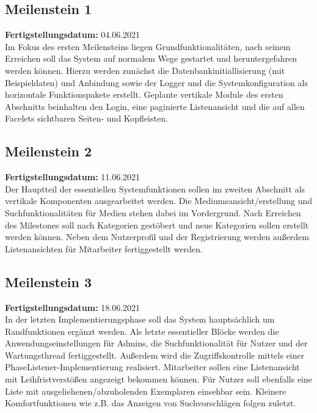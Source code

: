 \documentclass{article}
\begin{document}
\subsection{Meilenstein 1}
\textbf{Fertigstellungsdatum:} 04.06.2021 \\
Im Fokus des ersten Meilensteins liegen Grundfunktionalitäten, nach seinem Erreichen soll das System auf normalem Wege gestartet und heruntergefahren werden können. Hierzu werden zunächst die Datenbankinitiallisierung (mit Beispieldaten) und Anbindung sowie der Logger und die Systemkonfiguration als horizontale Funktionspakete erstellt. Geplante vertikale Module des ersten Abschnitts beinhalten den Login, eine paginierte Listenansicht und die auf allen Facelets sichtbaren Seiten- und Kopfleisten. 
\subsection{Meilenstein 2}
\textbf{Fertigstellungsdatum:} 11.06.2021 \\
Der Hauptteil der essentiellen Systemfunktionen sollen im zweiten Abschnitt als vertikale Komponenten ausgearbeitet werden. Die Mediumsansicht/erstellung und Suchfunktionalitäten für Medien stehen dabei im Vordergrund. Nach Erreichen des Milestones soll nach Kategorien gestöbert und neue Kategorien sollen erstellt werden können. Neben dem Nutzerprofil und der Registrierung werden außerdem Listenansichten für Mitarbeiter fertiggestellt werden.
\subsection{Meilenstein 3}
\textbf{Fertigstellungsdatum:} 18.06.2021 \\
In der letzten Implementierungsphase soll das System hauptsächlich um Randfunktionen ergänzt werden. Als letzte essentieller Blöcke werden die Anwendungseinstellungen für Admins, die Suchfunktionalität für Nutzer und der Wartungsthread fertiggestellt. Außerdem wird die Zugriffskontrolle mittels einer PhaseListener-Implementierung realisiert. Mitarbeiter sollen eine Listenansicht mit  Leihfristverstößen angezeigt bekommen können. Für Nutzer soll ebenfalls eine Liste mit ausgeliehenen/abzuholenden Exemplaren einsehbar sein. Kleinere Komfortfunktionen wie z.B. das Anzeigen von Suchvorschlägen folgen zuletzt.
\end{document}
